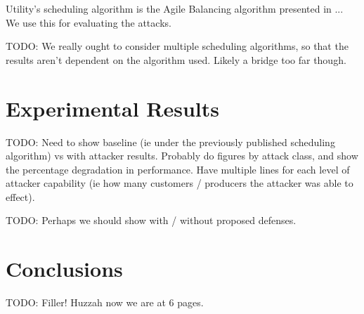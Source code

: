 \documentclass[conference]{IEEEtran}
\begin{document}
Utility's scheduling algorithm is the Agile Balancing algorithm presented in ... We use this for evaluating the attacks.

TODO:  We really ought to consider multiple scheduling algorithms, so that the results aren't dependent on the algorithm 
used.  Likely a bridge too far though.

\section{Experimental Results}

TODO: Need to show baseline (ie under the previously published scheduling algorithm) vs with attacker results.  Probably
do figures by attack class, and show the percentage degradation in performance.  Have multiple lines for each level of attacker
capability (ie how many customers / producers the attacker was able to effect).

TODO: Perhaps we should show with / without proposed defenses.


\section{Conclusions}

TODO:  Filler!  Huzzah now we are at 6 pages.



\end{document}
